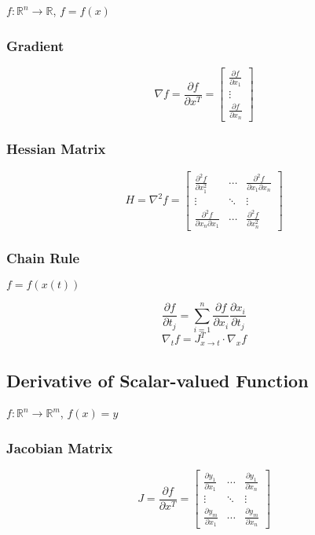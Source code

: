 \documentclass{article}
\begin{document}
$f: \mathbb{R}^n \to \mathbb{R}$, $f = f(x)$

\subsubsection{Gradient}

\[
    \nabla f = \frac{\partial f}{\partial x^T} = \begin{bmatrix}
        \frac{\partial f}{\partial x_1} \\
        \vdots \\
        \frac{\partial f}{\partial x_n}
    \end{bmatrix}
\]

\subsubsection{Hessian Matrix}

\[
    H = \nabla^2 f = \begin{bmatrix}
        \frac{\partial^2 f}{\partial x_1^2} & \cdots & \frac{\partial^2 f}{\partial x_1 \partial x_n} \\
        \vdots & \ddots & \vdots \\
        \frac{\partial^2 f}{\partial x_n \partial x_1} & \cdots & \frac{\partial^2 f}{\partial x_n^2}
    \end{bmatrix}
\]

\subsubsection{Chain Rule}

$f = f(x(t))$

\[
    \frac{\partial f}{\partial t_j} = \sum_{i=1}^n \frac{\partial f}{\partial x_i} \frac{\partial x_i}{\partial t_j}
\]
\[
    \nabla_t f = J_{x \to t}^T \cdot \nabla_x f
\]

\subsection{Derivative of Scalar-valued Function}

$f: \mathbb{R}^n \to \mathbb{R}^m$, $f(x) = y$

\subsubsection{Jacobian Matrix}

\[
    J = \frac{\partial f}{\partial x^T} = \begin{bmatrix}
        \frac{\partial y_1}{\partial x_1} & \cdots & \frac{\partial y_1}{\partial x_n} \\
        \vdots & \ddots & \vdots \\
        \frac{\partial y_m}{\partial x_1} & \cdots & \frac{\partial y_m}{\partial x_n}
    \end{bmatrix}
\]
\end{document}
